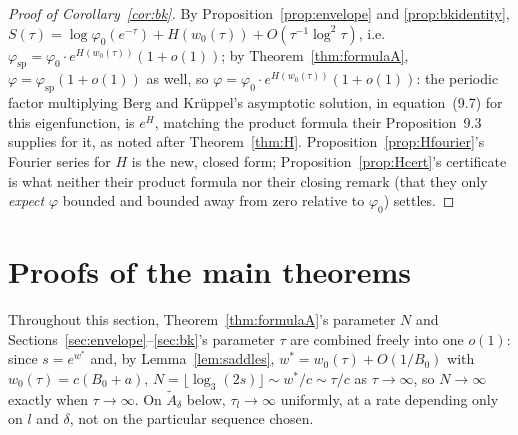 \documentclass[11pt]{amsart}
\theoremstyle{plain}
\theoremstyle{definition}
\theoremstyle{remark}
\begin{document}
\begin{proof}[Proof of Corollary~\ref{cor:bk}]
By Proposition~\ref{prop:envelope} and \ref{prop:bkidentity}, $S(\tau) = \log\varphi_0(e^{-\tau}) +
H(w_0(\tau)) + O(\tau^{-1}\log^2\tau)$, i.e.\ $\varphi_{\mathrm{sp}} = \varphi_0\cdot
e^{H(w_0(\tau))}(1+o(1))$; by Theorem~\ref{thm:formulaA}, $\varphi=\varphi_{\mathrm{sp}}(1+o(1))$
as well, so $\varphi = \varphi_0\cdot e^{H(w_0(\tau))}(1+o(1))$: the periodic factor multiplying
Berg and Kr\"uppel's asymptotic solution, in equation~(9.7) for this eigenfunction, is $e^H$,
matching the product formula their Proposition~9.3 supplies for it, as noted after
Theorem~\ref{thm:H}. Proposition~\ref{prop:Hfourier}'s Fourier series for $H$ is the new, closed
form; Proposition~\ref{prop:Hcert}'s certificate is what neither their product formula nor their
closing remark (that they only \emph{expect} $\varphi$ bounded and bounded away from zero relative
to $\varphi_0$) settles.
\end{proof}

\section{Proofs of the main theorems}
\label{sec:proofs}

Throughout this section, Theorem~\ref{thm:formulaA}'s parameter $N$ and
Sections~\ref{sec:envelope}--\ref{sec:bk}'s parameter $\tau$ are combined freely into one $o(1)$:
since $s=e^{w^*}$ and, by Lemma~\ref{lem:saddles}, $w^*=w_0(\tau)+O(1/B_0)$ with
$w_0(\tau)=c(B_0+a)$, $N=\lfloor\log_3(2s)\rfloor \sim w^*/c \sim \tau/c$ as $\tau\to\infty$, so
$N\to\infty$ exactly when $\tau\to\infty$. On $\widetilde{A}_\delta$ below, $\tau_l\to\infty$
uniformly, at a rate depending only on $l$ and $\delta$, not on the particular sequence chosen.
\end{document}
